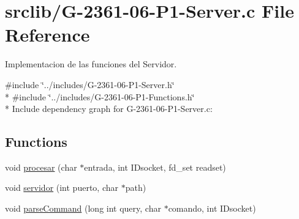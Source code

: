 \hypertarget{_g-2361-06-_p1-_server_8c}{}\section{srclib/\+G-\/2361-\/06-\/\+P1-\/\+Server.c File Reference}
\label{_g-2361-06-_p1-_server_8c}


Implementacion de las funciones del Servidor.  


{\ttfamily \#include \char`\"{}../includes/\+G-\/2361-\/06-\/\+P1-\/\+Server.\+h\char`\"{}}\\*
{\ttfamily \#include \char`\"{}../includes/\+G-\/2361-\/06-\/\+P1-\/\+Functions.\+h\char`\"{}}\\*
Include dependency graph for G-\/2361-\/06-\/\+P1-\/\+Server.c\+:
\subsection*{Functions}
\begin{DoxyCompactItemize}
\item 
void \hyperlink{_g-2361-06-_p1-_server_8c_a3053755c82b5168bea9d848b1284f3ca}{procesar} (char $\ast$entrada, int I\+Dsocket, fd\+\_\+set readset)
\item 
void \hyperlink{_g-2361-06-_p1-_server_8c_ae168ee6fdf31fd5ed7d49d45b89a65ed}{servidor} (int puerto, char $\ast$path)
\item 
void \hyperlink{_g-2361-06-_p1-_server_8c_ab7e145be74e8922987621cd01b8d446e}{parse\+Command} (long int query, char $\ast$comando, int I\+Dsocket)
\end{DoxyCompactItemize}
